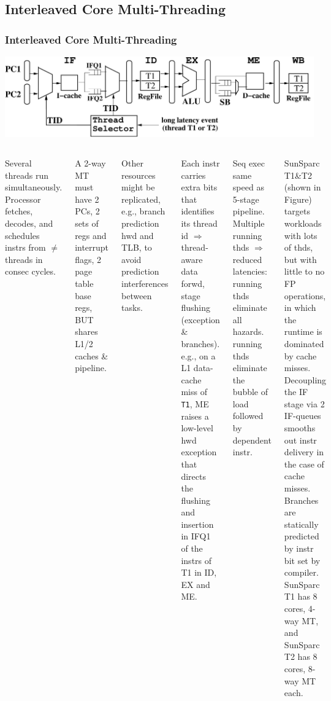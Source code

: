 \documentclass{beamer}
\renewcommand{\emph}[1]{\textcolor{structure}{#1}}
\newcommand{\emp}[1]{\textcolor{DikuRed}{ #1}}
\begin{document}
\begin{frame}[fragile,t]
\end{frame}


\subsection{Interleaved Core Multi-Threading}

\begin{frame}[fragile,t]
\frametitle{Interleaved Core Multi-Threading}
\vspace{-1ex}
\includegraphics[width=55ex]{Figures/InterleavedMT}
\smallskip

\begin{scriptsize}
\begin{columns}
Several threads run simultaneously.
Processor fetches, decodes, and schedules 
instrs from $\neq$ threads in consec cycles.\smallskip

A 2-way MT \emp{must have 2 PCs, 2 sets of regs and interrupt flags, 
2 page table base regs}, \emph{BUT shares L1/2 caches \&
pipeline}.\smallskip

Other resources might be replicated, e.g., branch prediction hwd and TLB,
to avoid prediction interferences between tasks.\smallskip

Each instr carries extra bits that identifies its thread id $\Rightarrow$
thread-aware data forwd, stage flushing (exception \& branches).
e.g., on a L1 data-cache miss of {\tt T1}, ME raises a low-level
hwd exception that directs the flushing and insertion
in IFQ1 of the instrs of T1 in ID, EX and ME.\smallskip

\emp{Seq exec same speed as 5-stage pipeline.}
\emph{Multiple running thds $\Rightarrow$ reduced latencies:} running thds eliminate all hazards. running thds eliminate the bubble of load followed by dependent instr.\smallskip

\alert{SunSparc T1\&T2} (shown in Figure) targets workloads with lots of thds, 
but with little to no FP operations, in which the runtime is dominated by cache misses. 
Decoupling the IF stage via 2 IF-queues smooths out instr delivery in the case of cache 
misses.   Branches are statically predicted by instr bit set by compiler. 
SunSparc T1 has 8 cores, 4-way MT, and SunSparc T2 has 8 cores, 8-way MT each. 

\end{columns}
\end{scriptsize}

\end{frame}
\end{document}
